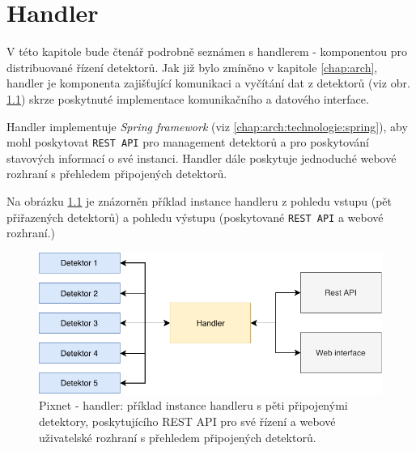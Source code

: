 

\chapter{Handler}\label{chap:handler}

V této kapitole bude čtenář podrobně seznámen s handlerem - komponentou pro distribuované řízení detektorů. Jak již bylo zmíněno v kapitole \ref{chap:arch}, handler je komponenta zajišťující komunikaci a vyčítání dat z detektorů (viz obr. \ref{fig:handler:overview}) skrze poskytnuté implementace komunikačního a datového interface.
  
Handler implementuje \textit{Spring framework} (viz \ref{chap:arch:technologie:spring}), aby mohl poskytovat \texttt{REST API} pro management detektorů a pro poskytování stavových informací o své instanci. Handler dále poskytuje jednoduché webové rozhraní s přehledem připojených detektorů.

Na obrázku \ref{fig:handler:overview} je znázorněn příklad instance handleru z pohledu vstupu (pět přiřazených detektorů) a pohledu výstupu (poskytované \texttt{REST API} a webové rozhraní.)

\begin{figure}[bh]
	\begin{center}
		\vspace*{1cm}
		\includegraphics[width=14cm]{figures/handler_overview.pdf}
		\caption{Pixnet - handler: příklad instance handleru s pěti připojenými detektory, poskytujícího REST API pro své řízení a webové uživatelské rozhraní s přehledem připojených detektorů.}
		\label{fig:handler:overview}
	\end{center}
\end{figure}

\newpage

